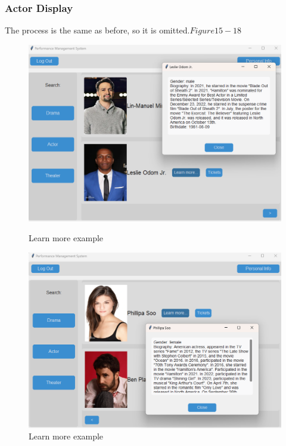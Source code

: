\documentclass[12pt]{article}
\begin{document}
\subsubsection{Actor Display}
\par The process is the same as before, so it is omitted.\(Figure15-18\)
\begin{figure}[H]
    \centering
    \begin{minipage}{0.48\textwidth}
        \centering
        \includegraphics[width=\textwidth]{15.png}
        \caption{Learn more example} 
        \label{Figure 15}
    \end{minipage}
    \hfill
    \begin{minipage}{0.48\textwidth}
        \centering
        \includegraphics[width=\textwidth]{16.png}
        \caption{Learn more example}
        \label{Figure 16}
    \end{minipage}
\end{figure}
\end{document}
